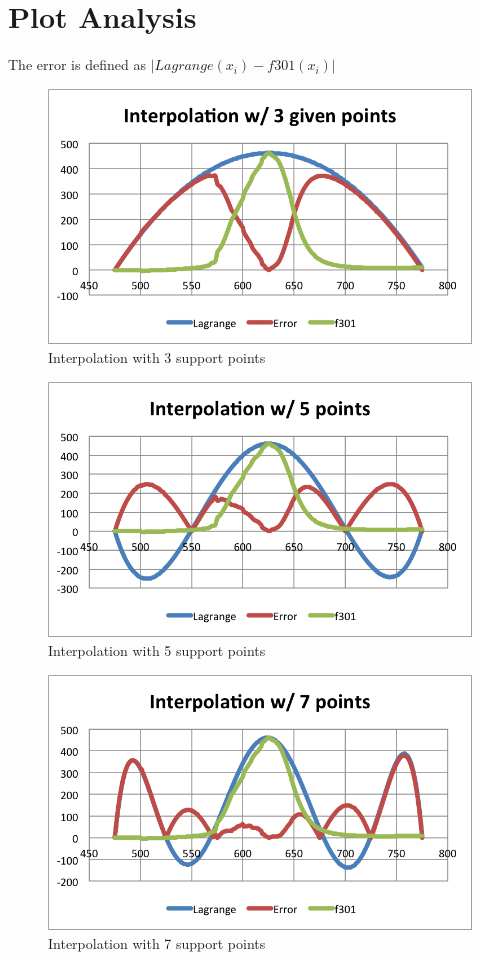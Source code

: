 \documentclass[12pt,a4paper]{article}
\begin{document}
\section{Plot Analysis}
The error is defined as $| Lagrange(x_i) - f301(x_i) |$
\begin{figure}[h!]
  \centering
      \includegraphics[width=1\textwidth]{./3.png}
  \caption{Interpolation with 3 support points}
\end{figure}
\newpage
\begin{figure}[h!]
  \centering
      \includegraphics[width=1\textwidth]{./5.png}
  \caption{Interpolation with 5 support points}
\end{figure}
\begin{figure}[h!]
  \centering
      \includegraphics[width=1\textwidth]{./7.png}
  \caption{Interpolation with 7 support points}
\end{figure}
\end{document}
